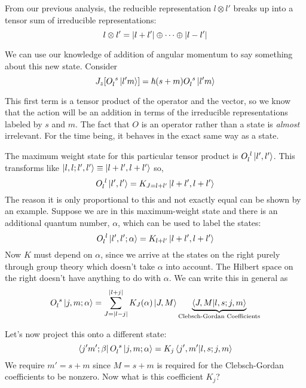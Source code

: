 \documentclass[a4paper,twoside,master.tex]{subfiles}
\begin{document}
From our previous analysis, the reducible representation $ l \otimes l' $ breaks up into a tensor sum of irreducible representations:
\begin{equation}
    l \otimes l' = \abs{l+l'} \oplus \cdots \oplus \abs{l-l'}
\end{equation}

We can use our knowledge of addition of angular momentum to say something about this new state. Consider
\begin{equation}
    J_z [O\indices{_l^s}\ket{l'm}] = \hbar (s + m) O\indices{_l^s}\ket{l'm}
\end{equation}

This first term is a tensor product of the operator and the vector, so we know that the action will be an addition in terms of the irreducible representations labeled by $ s $ and $ m $. The fact that $ O $ is an operator rather than a state is \textit{almost} irrelevant. For the time being, it behaves in the exact same way as a state.

The maximum weight state for this particular tensor product is $ O\indices{_l^l}\ket{l',l'} $. This transforms like $\ket{l,l;l',l'} \equiv\ket{l+l', l+l'} $ so,
\begin{equation}
    O\indices{_l^l}\ket{l',l'} = K_{J=l+l'}\ket{l + l', l + l'}
\end{equation}
The reason it is only proportional to this and not exactly equal can be shown by an example. Suppose we are in this maximum-weight state and there is an additional quantum number, $ \alpha $, which can be used to label the states:
\begin{equation}
    O\indices{_l^l}\ket{l',l'; \alpha} = K_{l+l'}\ket{l+l',l+l'}
\end{equation}
Now $ K $ must depend on $ \alpha $, since we arrive at the states on the right purely through group theory which doesn't take $ \alpha $ into account. The Hilbert space on the right doesn't have anything to do with $ \alpha $. We can write this in general as
\begin{equation}
    O\indices{_l^s}\ket{j,m; \alpha} = \sum_{J= \abs{l-j}}^{\abs{l+j}} K_J(\alpha)\ket{J,M}\underbrace{\bra{J,M}\ket{l,s;j,m}}_{\text{Clebsch-Gordan Coefficients}}
\end{equation}

Let's now project this onto a different state:
\begin{equation}
    \bra{j'm'; \beta} O\indices{_l^s}\ket{j,m; \alpha} = K_j\bra{j', m'}\ket{l,s;j,m}
\end{equation}
We require $ m' = s + m $ since $ M = s+m $ is required for the Clebsch-Gordan coefficients to be nonzero. Now what is this coefficient $ K_j $?
\end{document}
